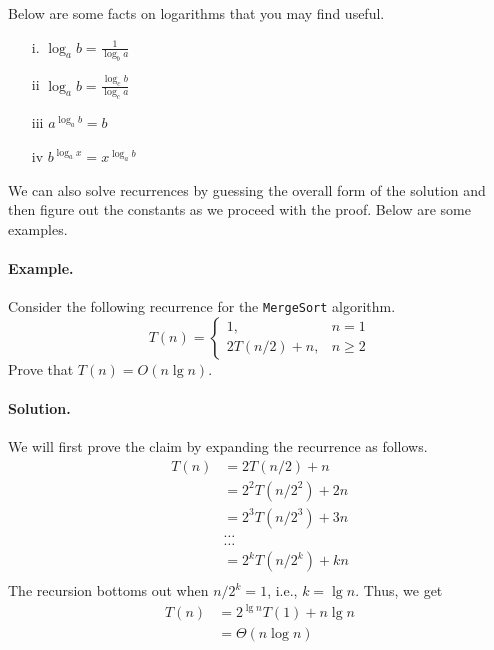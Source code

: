 \documentclass[11pt,twoside]{article}
\def\ni{\noindent}
\begin{document}
Below are some facts on logarithms that you may find useful.
\begin{enumerate}
\item[i.]
$\log_a b = \frac{1}{\log_b a}$
\item[ii]
$\log_a b = \frac{\log_c b}{\log_c a}$
\item[iii]
$a^{\log_a b} = b$
\item[iv] $b^{\log_a x} = x^{\log_a b}$ 
\end{enumerate}

\ni
We can also solve recurrences by guessing the overall form of the
solution and then figure out the constants as we proceed with the
proof. Below are some examples.

\paragraph{Example.} Consider the following recurrence for the \texttt{MergeSort} algorithm.
\[
T(n) = \left\{ \begin{array}{ll}
        1, & n=1\\
        2T(n/2) + n, &  n \geq 2 

      \end{array} \right.
\]
Prove that $T(n)=O(n\lg n)$.

\paragraph{Solution.} We will first prove the claim by expanding the recurrence as follows.
\begin{align*}
T(n) & =  2T(n/2) + n \\
& =  2^2T(n/2^2) + 2n \\
& =  2^3T(n/2^3) + 3n\\
&  \ldots \\
&  \ldots \\
& =  2^kT(n/2^k) + kn \\
\end{align*}
\noindent
The recursion bottoms out when $n/2^k=1$, i.e., $k=\lg n$. Thus, we get
\begin{align*}
T(n) & =  2^{\lg n}T(1) + n\lg n\\
     & =  \Theta(n\log n)\\
\end{align*}
\end{document}
